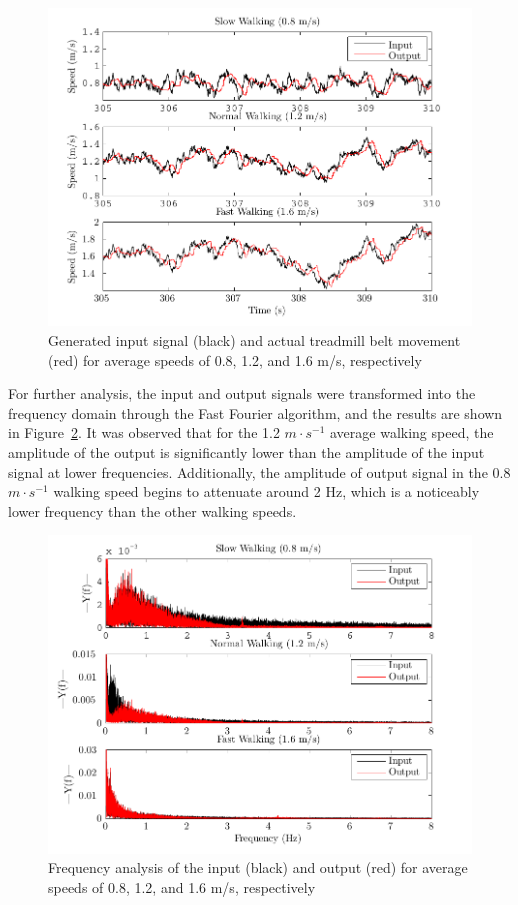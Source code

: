 \documentclass{article}
\begin{document}
\begin{figure}
  \includegraphics{figures/input_vs_output.pdf}
  \caption{Generated input signal (black) and actual treadmill belt movement
                (red) for average speeds of 0.8, 1.2, and 1.6 m/s, respectively}
  \label{fig:input_output}
\end{figure}

For further analysis, the input and output signals were transformed into the 
frequency domain through the Fast Fourier algorithm, and the results are
shown in Figure~\ref{fig:freq_analysis}.  It was observed that for the 1.2 $m \cdot s^{-1}$
average walking speed, the amplitude of the output is significantly lower 
than the amplitude of the input signal at lower frequencies.  Additionally, the 
amplitude of output signal in the 0.8 $m \cdot s^{-1}$ walking speed begins to attenuate 
around 2 Hz, which is a noticeably lower frequency than the other walking 
speeds.  

\begin{figure}
  \includegraphics{figures/frequency_analysis.pdf}
  \caption{Frequency analysis of the  input (black) and output (red)
                for average speeds of 0.8, 1.2, and 1.6 m/s, respectively}
  \label{fig:freq_analysis}
\end{figure}
\end{document}
